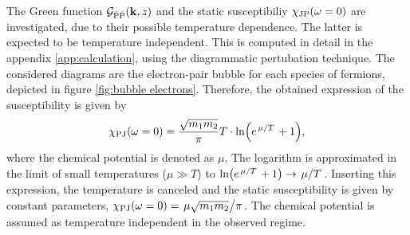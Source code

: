 The Green function $\mathcal{G}_{\dot{\mathrm{P}}\dot{\mathrm{P}}}(\vb{k}, z)$ and the static susceptibiliy $\chi_{\mathrm{JP}}(\omega = 0)$ are investigated, due to their possible temperature dependence.
The latter is expected to be temperature independent.
This is computed in detail in the appendix \ref{app:calculation}, using the diagrammatic pertubation technique.
The considered diagrams are the electron-pair bubble for each species of fermions, depicted in figure \ref{fig:bubble electrons}.
Therefore, the obtained expression of the susceptibility is given by
%
\begin{align}
	\chi_{\mt{PJ}}(\omega = 0) = \frac{\sqrt{m_{1} m_{2}}}{\pi} T \cdot \ln(e^{\flatfrac{\mu}{T}} + 1),
\end{align}
%
where the chemical potential is denoted as $\mu$.
The logarithm is approximated in the limit of small temperatures ($\mu \gg T$) to $\ln(e^{\flatfrac{\mu}{T}} + 1) \rightarrow \flatfrac{\mu}{T}$.
Inserting this expression, the temperature is canceled and the static susceptibility is given by constant parameters, $\chi_{\mt{PJ}}(\omega = 0) = \flatfrac{\mu\sqrt{m_{1} m_{2}}}{\pi}$.
The chemical potential is assumed as temperature independent in the observed regime.


